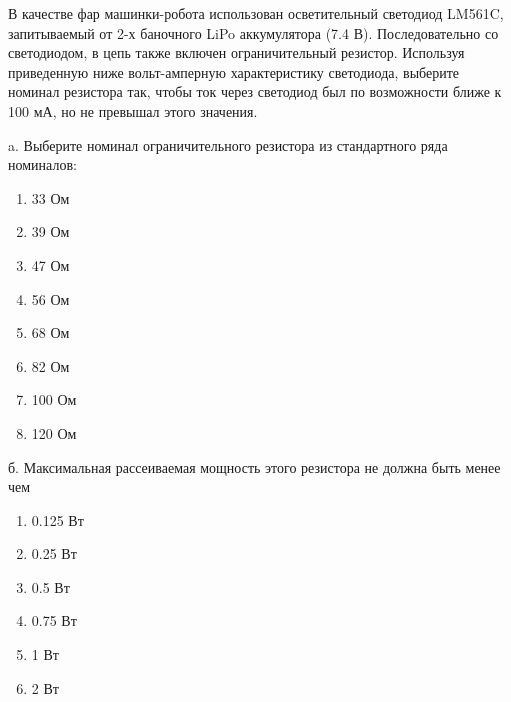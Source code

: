 
В качестве фар машинки-робота использован осветительный светодиод LM561C, запитываемый от 2-х баночного LiPo 
аккумулятора (7.4 В). Последовательно со светодиодом, в цепь также включен ограничительный резистор. 
Используя приведенную ниже вольт-амперную характеристику светодиода, выберите номинал резистора так, 
чтобы ток через светодиод был по возможности ближе к 100 мА, но не превышал этого значения.


a. Выберите номинал ограничительного резистора из стандартного ряда номиналов:

\begin{enumerate}
    \item 33 Ом
    \item 39 Ом
    \item 47 Ом
    \item 56 Ом
    \item 68 Ом
    \item 82 Ом
    \item 100 Ом
    \item 120 Ом
\end{enumerate}

б. Максимальная рассеиваемая мощность этого резистора не должна быть менее чем 

\begin{enumerate}
    \item 0.125 Вт
    \item 0.25 Вт
    \item 0.5 Вт
    \item 0.75 Вт
    \item 1 Вт
    \item 2 Вт
\end{enumerate}

